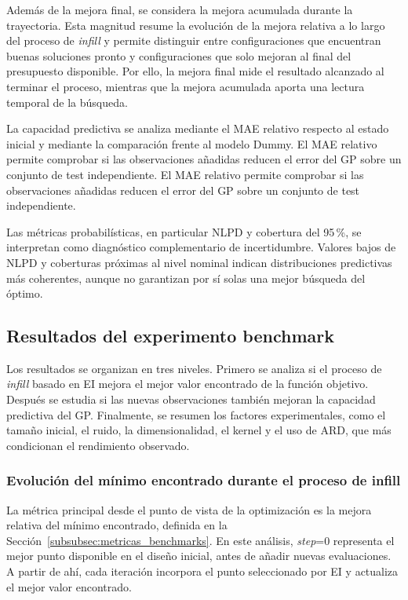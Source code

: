 Además de la mejora final, se considera la mejora acumulada durante la trayectoria. Esta magnitud resume la evolución de la mejora relativa a lo largo del proceso de \emph{infill} y permite distinguir entre configuraciones que encuentran buenas soluciones pronto y configuraciones que solo mejoran al final del presupuesto disponible. Por ello, la mejora final mide el resultado alcanzado al terminar el proceso, mientras que la mejora acumulada aporta una lectura temporal de la búsqueda.

La capacidad predictiva se analiza mediante el MAE relativo respecto al estado inicial y mediante la comparación frente al modelo Dummy. El MAE relativo permite comprobar si las observaciones añadidas reducen el error del GP sobre un conjunto de test independiente. El MAE relativo permite comprobar si las observaciones añadidas reducen el error del GP sobre un conjunto de test independiente.

Las métricas probabilísticas, en particular NLPD y cobertura del 95 \%, se interpretan como diagnóstico complementario de incertidumbre. Valores bajos de NLPD y coberturas próximas al nivel nominal indican distribuciones predictivas más coherentes, aunque no garantizan por sí solas una mejor búsqueda del óptimo.

\subsection{Resultados del experimento benchmark}\label{subsec:resultados_benchmarks}

Los resultados se organizan en tres niveles. Primero se analiza si el proceso de \emph{infill} basado en EI mejora el mejor valor encontrado de la función objetivo. Después se estudia si las nuevas observaciones también mejoran la capacidad predictiva del GP. Finalmente, se resumen los factores experimentales, como el tamaño inicial, el ruido, la dimensionalidad, el kernel y el uso de ARD, que más condicionan el rendimiento observado.

\subsubsection{Evolución del mínimo encontrado durante el proceso de infill}\label{subsubsec:resultados_incumbent_benchmarks}

La métrica principal desde el punto de vista de la optimización es la mejora relativa del mínimo encontrado, definida en la Sección~\ref{subsubsec:metricas_benchmarks}. En este análisis, \emph{step}=0 representa el mejor punto disponible en el diseño inicial, antes de añadir nuevas evaluaciones. A partir de ahí, cada iteración incorpora el punto seleccionado por EI y actualiza el mejor valor encontrado.

